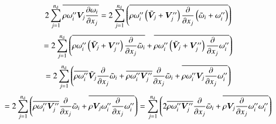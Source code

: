 \documentclass{warpdoc}
\newcommand{\nd}{{{n}_{\rm d}}}
\begin{document}
%
\begin{displaymath}
     2 \sum_{j=1}^{\nd} \overline{\rho \omega_i^{\prime\prime} \bm{V}_j  \frac{\partial \omega_i }{\partial x_j}}
   = 2 \sum_{j=1}^{\nd} \left(
                           \overline{\rho \omega_i^{\prime\prime} \left({\wtilde{\bm{V}}_j}+\bm{V}_j^{\prime\prime}\right)
                                     \frac{\partial }{\partial x_j} \left({\wtilde{\omega}_i}+\omega_i^{\prime\prime}\right)
                                    }
                       \right)
\end{displaymath}
%
%
\begin{displaymath}
   = 2 \sum_{j=1}^{\nd} \left(
                              \overline{\rho \omega_i^{\prime\prime} \left({\wtilde{\bm{V}}_j}+\bm{V}_j^{\prime\prime}\right)
                                      \frac{\partial }{\partial x_j} {\wtilde{\omega}_i}
                                    }
                          +   \overline{\rho \omega_i^{\prime\prime} \left({\wtilde{\bm{V}}_j}+\bm{V}_j^{\prime\prime}\right)
                                     \frac{\partial }{\partial x_j} \omega_i^{\prime\prime}
                                    }
                       \right)
\end{displaymath}
%
%
\begin{displaymath}
  =2 \sum_{j=1}^{\nd} \left(
                              \overline{\rho \omega_i^{\prime\prime}} {\wtilde{\bm{V}}_j}
                                      \frac{\partial }{\partial x_j} {\wtilde{\omega}_i}
                          +   \overline{\rho \omega_i^{\prime\prime} \bm{V}_j^{\prime\prime}}
                                      \frac{\partial }{\partial x_j} {\wtilde{\omega}_i}
                          +   \overline{\rho \omega_i^{\prime\prime} \bm{V}_j
                                      \frac{\partial }{\partial x_j} \omega_i^{\prime\prime}
                                    }
                       \right)
\end{displaymath}
%
\begin{displaymath}
  =2 \sum_{j=1}^{\nd} \left(
                              \overline{\rho \omega_i^{\prime\prime} \bm{V}_j^{\prime\prime}}
                                      \frac{\partial }{\partial x_j} {\wtilde{\omega}_i}
                          +   \overline{\rho \bm{V}_j \omega_i^{\prime\prime}
                                      \frac{\partial }{\partial x_j} \omega_i^{\prime\prime}
                                    }
                       \right)
  =\sum_{j=1}^{\nd} \left(
                              2 \overline{\rho \omega_i^{\prime\prime} \bm{V}_j^{\prime\prime}}
                                      \frac{\partial }{\partial x_j} {\wtilde{\omega}_i}
                          +   \overline{\rho \bm{V}_j 
                                     \frac{\partial }{\partial x_j} \omega_i^{\prime\prime} \omega_i^{\prime\prime}
                                    }
                     \right)
\end{displaymath}
\end{document}

